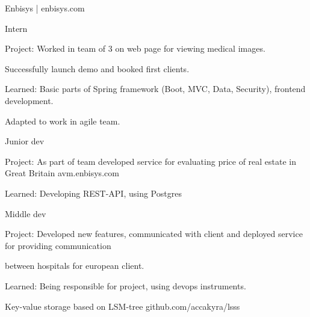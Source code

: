 \documentclass[]{cv-style}
\begin{document}
    {\large{Enbisys | enbisys.com}}
    {\par}
    \vspace{0.2cm}
    {Intern}
    {\par}
    \hspace*{0.7cm} Project: Worked in team of 3 on web page for viewing medical images.
    {\par}
    \hspace*{0.7cm} Successfully launch demo and booked first clients.
    {\par}
    \hspace*{0.7cm} Learned: Basic parts of Spring framework (Boot, MVC, Data, Security), frontend development.
    {\par}
    \hspace*{0.7cm} Adapted to work in agile team.
    {\par}
    \vspace{0.1cm}
    {Junior dev}
    {\par}
    \hspace*{0.7cm} Project: As part of team developed service for evaluating price of real estate in Great Britain
    avm.enbisys.com
    {\par}
    \hspace*{0.7cm} Learned: Developing REST-API, using Postgres
    {\par}
    \vspace{0.1cm}
    {Middle dev}
    {\par}
    \hspace*{0.7cm} Project: Developed new features, communicated with client and deployed service for providing communication
    {\par}
    \hspace*{0.7cm} between hospitals for european client.
    {\par}
    \hspace*{0.7cm} Learned: Being responsible for project, using devops instruments.
    {\par}
    \vspace{0.3cm}

    \vspace{1cm}


    \hspace*{0.7cm} {Key-value storage based on LSM-tree github.com/accakyra/lsss}

    \vspace{1cm}
\end{document}
